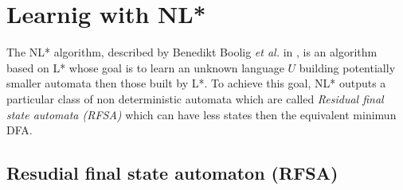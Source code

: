 \section{Learnig with NL* }

The NL* algorithm, described by Benedikt Boolig \textit{et al.} in \cite{NLPaper}, is an algorithm based on L* whose goal is to learn an unknown language $U$ building potentially smaller automata then those built by L*. To achieve this goal, NL* outputs a particular class of non deterministic automata which are called \textit{Residual final state automata (RFSA)} which can have less states then the equivalent minimun DFA.

\subsection{Resudial final state automaton (RFSA)}









